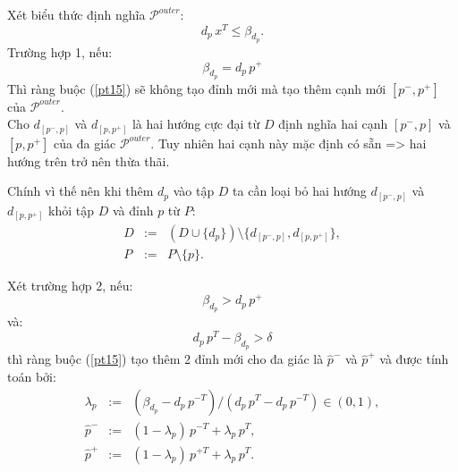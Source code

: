 \documentclass[11pt]{beamer}
\theoremstyle{definition}
\theoremstyle{plain}
\theoremstyle{plain}
\theoremstyle{remark}
\begin{document}
\begin{frame}
	Xét biểu thức định nghĩa $\mathcal{P}^{outer}$:
	\begin{equation}\label{pt15}
		d_p\, x^T \leq \beta_{d_p}.
	\end{equation}
	Trường hợp 1, nếu:
	\begin{equation}
		\label{betaequal}
		\beta_{d_p} = d_p\, p^+
	\end{equation}
	Thì ràng buộc (\ref{pt15}) sẽ không tạo đỉnh mới mà tạo thêm cạnh mới $[p^-, p^+]$ của $\mathcal{P}^{outer}$.\\
	Cho $d_{[p^-, p]}$ và $d_{[p, p^+]}$ là hai hướng cực đại từ $D$ định nghĩa hai cạnh $[p^-, p]$ và $[p, p^+]$ của đa giác $\mathcal{P}^{outer}$. Tuy nhiên hai cạnh này mặc định có sẵn => hai hướng trên trở nên thừa thãi. 
	
\end{frame}

\begin{frame}
	Chính vì thế nên khi thêm $d_p$ vào tập $D$ ta cần loại bỏ hai hướng $d_{[p^-, p]}$ và $d_{[p, p^+]}$ khỏi tập $D$ và đỉnh $p$ từ $P$:
	\begin{equation}\label{newDP2}
		\begin{array}{lcl}
			D &:=& (D \cup \{d_{p}\})\setminus \{d_{[p^-,p]}, d_{[p,p^+]}\}, \\
			P &:=& P \setminus \{p\}.
		\end{array}
	\end{equation}
\end{frame}

\begin{frame}
	Xét trường hợp 2, nếu:
	\begin{equation}\label{betagreater}
		\beta_{d_p} > d_p\, p^+
	\end{equation}
	và:
	\begin{equation}\label{greaterdelta}
		d_{p}\, p^T - \beta_{d_{p}} > \delta
	\end{equation}
	thì ràng buộc (\ref{pt15}) tạo thêm 2 đỉnh mới cho đa giác là $\hat p^-$ và $\hat p^+$ và được tính toán bởi:
	\begin{equation}\label{def_hatp}
		\begin{array}{lcl}
			\lambda_p &:=& (\beta_{d_p} - d_p\, p^{-T})/(d_p\, p^T - d_p\, p^{-T}) \in (0, 1), \\
			\hat p^- &:=& (1 - \lambda_p)\, p^{-T} + \lambda_p\, p^T, \\
			\hat p^+ &:=& (1 - \lambda_p)\, p^{+T} + \lambda_p\, p^T.
		\end{array}
	\end{equation}
\end{frame}
\end{document}
